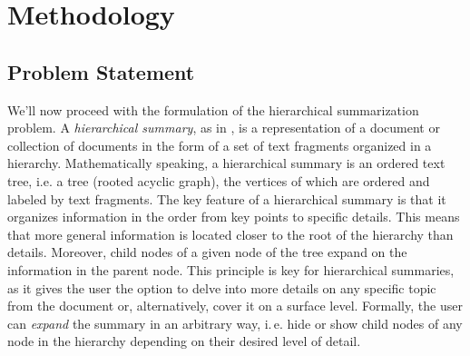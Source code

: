 \documentclass[11pt,a4paper]{article}
\begin{document}

\section{Methodology}

\subsection{Problem Statement}
We'll now proceed with the formulation of the hierarchical summarization problem. A \textit{hierarchical summary}, as in \cite{christensen2014hierarchical}, is a representation of a document or collection of documents in the form of a set of text fragments organized in a hierarchy. Mathematically speaking, a hierarchical summary is an ordered text tree, i.e. a tree (rooted acyclic graph), the vertices of which are ordered and labeled by text fragments. The key feature of a hierarchical summary is that it organizes information in the order from key points to specific details. This means that more general information is located closer to the root of the hierarchy than details. Moreover, child nodes of a given node of the tree expand on the information in the parent node. This principle is key for hierarchical summaries, as it gives the user the option to delve into more details on any specific topic from the document or, alternatively, cover it on a surface level. Formally, the user can \textit{expand} the summary in an arbitrary way, i.\,e. hide or show child nodes of any node in the hierarchy depending on their desired level of detail.
\end{document}
